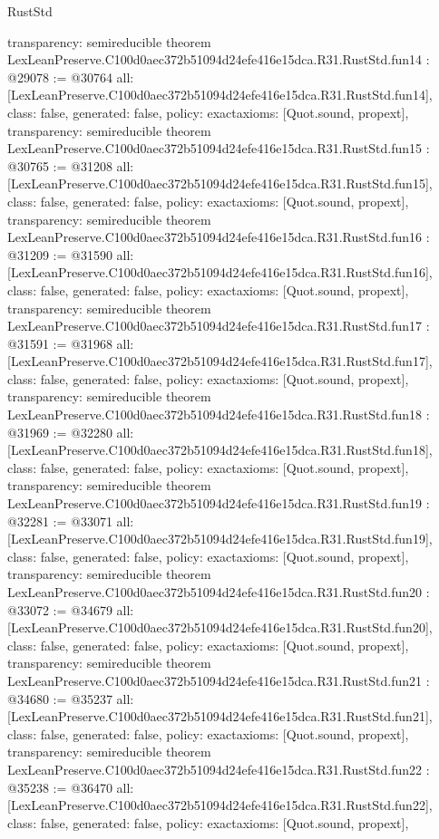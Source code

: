 \begin{lexlean}{RustStd}
\begin{coremodule}
{  transparency: semireducible
}
theorem LexLeanPreserve.C100d0aec372b51094d24efe416e15dca.R31.RustStd.fun14 : @29078 := @30764 {
  all: [LexLeanPreserve.C100d0aec372b51094d24efe416e15dca.R31.RustStd.fun14],
  class: false,
  generated: false,
  policy: exact{axioms: [Quot.sound, propext]},
  transparency: semireducible
}
theorem LexLeanPreserve.C100d0aec372b51094d24efe416e15dca.R31.RustStd.fun15 : @30765 := @31208 {
  all: [LexLeanPreserve.C100d0aec372b51094d24efe416e15dca.R31.RustStd.fun15],
  class: false,
  generated: false,
  policy: exact{axioms: [Quot.sound, propext]},
  transparency: semireducible
}
theorem LexLeanPreserve.C100d0aec372b51094d24efe416e15dca.R31.RustStd.fun16 : @31209 := @31590 {
  all: [LexLeanPreserve.C100d0aec372b51094d24efe416e15dca.R31.RustStd.fun16],
  class: false,
  generated: false,
  policy: exact{axioms: [Quot.sound, propext]},
  transparency: semireducible
}
theorem LexLeanPreserve.C100d0aec372b51094d24efe416e15dca.R31.RustStd.fun17 : @31591 := @31968 {
  all: [LexLeanPreserve.C100d0aec372b51094d24efe416e15dca.R31.RustStd.fun17],
  class: false,
  generated: false,
  policy: exact{axioms: [Quot.sound, propext]},
  transparency: semireducible
}
theorem LexLeanPreserve.C100d0aec372b51094d24efe416e15dca.R31.RustStd.fun18 : @31969 := @32280 {
  all: [LexLeanPreserve.C100d0aec372b51094d24efe416e15dca.R31.RustStd.fun18],
  class: false,
  generated: false,
  policy: exact{axioms: [Quot.sound, propext]},
  transparency: semireducible
}
theorem LexLeanPreserve.C100d0aec372b51094d24efe416e15dca.R31.RustStd.fun19 : @32281 := @33071 {
  all: [LexLeanPreserve.C100d0aec372b51094d24efe416e15dca.R31.RustStd.fun19],
  class: false,
  generated: false,
  policy: exact{axioms: [Quot.sound, propext]},
  transparency: semireducible
}
theorem LexLeanPreserve.C100d0aec372b51094d24efe416e15dca.R31.RustStd.fun20 : @33072 := @34679 {
  all: [LexLeanPreserve.C100d0aec372b51094d24efe416e15dca.R31.RustStd.fun20],
  class: false,
  generated: false,
  policy: exact{axioms: [Quot.sound, propext]},
  transparency: semireducible
}
theorem LexLeanPreserve.C100d0aec372b51094d24efe416e15dca.R31.RustStd.fun21 : @34680 := @35237 {
  all: [LexLeanPreserve.C100d0aec372b51094d24efe416e15dca.R31.RustStd.fun21],
  class: false,
  generated: false,
  policy: exact{axioms: [Quot.sound, propext]},
  transparency: semireducible
}
theorem LexLeanPreserve.C100d0aec372b51094d24efe416e15dca.R31.RustStd.fun22 : @35238 := @36470 {
  all: [LexLeanPreserve.C100d0aec372b51094d24efe416e15dca.R31.RustStd.fun22],
  class: false,
  generated: false,
  policy: exact{axioms: [Quot.sound, propext]},
}
\end{coremodule}
\end{lexlean}
